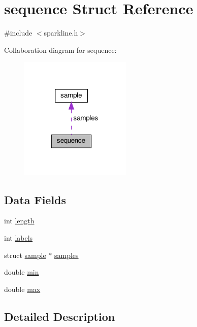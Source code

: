 \hypertarget{structsequence}{}\section{sequence Struct Reference}
\label{structsequence}


{\ttfamily \#include $<$sparkline.\+h$>$}



Collaboration diagram for sequence\+:
\nopagebreak
\begin{figure}[H]
\begin{center}
\leavevmode
\includegraphics[width=150pt]{structsequence__coll__graph}
\end{center}
\end{figure}
\subsection*{Data Fields}
\begin{DoxyCompactItemize}
\item 
int \hyperlink{structsequence_a9f59b34b1f25fe00023291b678246bcc}{length}
\item 
int \hyperlink{structsequence_a26e3b3147137397b7783e99e49618692}{labels}
\item 
struct \hyperlink{structsample}{sample} $\ast$ \hyperlink{structsequence_ae985c67fe47c15411bae03a679a5578e}{samples}
\item 
double \hyperlink{structsequence_aad36546e8175d2922bee165fe028fedc}{min}
\item 
double \hyperlink{structsequence_a0b0ede69e8156eb97acc579b88e883de}{max}
\end{DoxyCompactItemize}


\subsection{Detailed Description}


